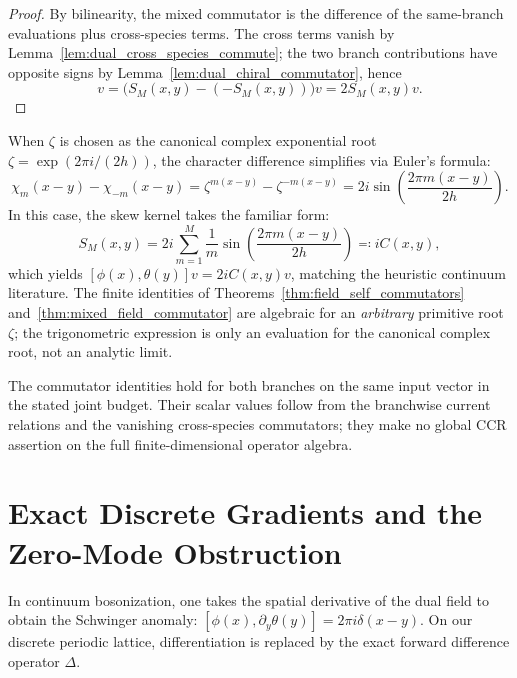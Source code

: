 \begin{proof}
By bilinearity, the mixed commutator is the difference of the same-branch evaluations plus cross-species terms. The cross terms vanish by Lemma~\ref{lem:dual_cross_species_commute}; the two branch contributions have opposite signs by Lemma~\ref{lem:dual_chiral_commutator}, hence
\begin{equation}
[\phi(x),\theta(y)]v=\bigl(S_M(x,y)-(-S_M(x,y))\bigr)v=2S_M(x,y)v.
\end{equation}
\end{proof}

\begin{remark}
When $\zeta$ is chosen as the canonical complex exponential root $\zeta = \exp(2\pi i / (2h))$, the character difference simplifies via Euler's formula:
\begin{equation}
\chi_m(x - y) - \chi_{-m}(x - y) = \zeta^{m(x-y)} - \zeta^{-m(x-y)} = 2i \sin\left(\frac{2\pi m (x - y)}{2h}\right).
\end{equation}
In this case, the skew kernel takes the familiar form:
\begin{equation}
S_M(x, y) = 2i \sum_{m=1}^M \frac{1}{m} \sin\left(\frac{2\pi m (x - y)}{2h}\right) \eqqcolon i C(x, y),
\end{equation}
which yields $[\phi(x), \theta(y)] v = 2i C(x, y) v$, matching the heuristic continuum literature. The finite identities of Theorems~\ref{thm:field_self_commutators} and~\ref{thm:mixed_field_commutator} are algebraic for an \emph{arbitrary} primitive root $\zeta$; the trigonometric expression is only an evaluation for the canonical complex root, not an analytic limit.
\end{remark}

\begin{remark}
The commutator identities hold for both branches on the same input vector in the stated joint budget. Their scalar values follow from the branchwise current relations and the vanishing cross-species commutators; they make no global CCR assertion on the full finite-dimensional operator algebra.
\end{remark}

\section{Exact Discrete Gradients and the Zero-Mode Obstruction}

In continuum bosonization, one takes the spatial derivative of the dual field to obtain the Schwinger anomaly: $[\phi(x), \partial_y \theta(y)] = 2\pi i \delta(x - y)$. On our discrete periodic lattice, differentiation is replaced by the exact forward difference operator $\Delta$.

